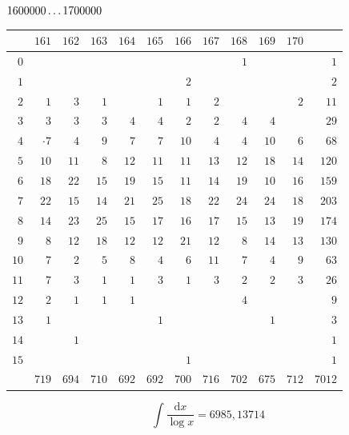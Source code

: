 \clearpage
\noindent\begin{minipage}{\linewidth}\centering
{}
\(1600000\mathinner{.\,.\,.}1700000\)\par\smallskip
\begingroup\fontsize{10.5}{11.5}\selectfont\setlength{\tabcolsep}{3.5pt}\renewcommand{\arraystretch}{1}
\begin{tabular}{r|rrrrrrrrrr|r}\hline
 & $161$ & $162$ & $163$ & $164$ & $165$ & $166$ & $167$ & $168$ & $169$ & $170$ &  \\ \hline
$0$ &  &  &  &  &  &  &  & $1$ &  &  & $1$ \\
$1$ &  &  &  &  &  & $2$ &  &  &  &  & $2$ \\
$2$ & $1$ & $3$ & $1$ &  & $1$ & $1$ & $2$ &  &  & $2$ & $11$ \\
$3$ & $3$ & $3$ & $3$ & $4$ & $4$ & $2$ & $2$ & $4$ & $4$ &  & $29$ \\
$4$ & $\mathord{\cdot}\!7$ & $4$ & $9$ & $7$ & $7$ & $10$ & $4$ & $4$ & $10$ & $6$ & $68$ \\
$5$ & $10$ & $11$ & $8$ & $12$ & $11$ & $11$ & $13$ & $12$ & $18$ & $14$ & $120$ \\
$6$ & $18$ & $22$ & $15$ & $19$ & $15$ & $11$ & $14$ & $19$ & $10$ & $16$ & $159$ \\
$7$ & $22$ & $15$ & $14$ & $21$ & $25$ & $18$ & $22$ & $24$ & $24$ & $18$ & $203$ \\
$8$ & $14$ & $23$ & $25$ & $15$ & $17$ & $16$ & $17$ & $15$ & $13$ & $19$ & $174$ \\
$9$ & $8$ & $12$ & $18$ & $12$ & $12$ & $21$ & $12$ & $8$ & $14$ & $13$ & $130$ \\
$10$ & $7$ & $2$ & $5$ & $8$ & $4$ & $6$ & $11$ & $7$ & $4$ & $9$ & $63$ \\
$11$ & $7$ & $3$ & $1$ & $1$ & $3$ & $1$ & $3$ & $2$ & $2$ & $3$ & $26$ \\
$12$ & $2$ & $1$ & $1$ & $1$ &  &  &  & $4$ &  &  & $9$ \\
$13$ & $1$ &  &  &  & $1$ &  &  &  & $1$ &  & $3$ \\
$14$ &  & $1$ &  &  &  &  &  &  &  &  & $1$ \\
$15$ &  &  &  &  &  & $1$ &  &  &  &  & $1$ \\
\hline
 & $719$ & $694$ & $710$ & $692$ & $692$ & $700$ & $716$ & $702$ & $675$ & $712$ & $7012$ \\ \hline
\end{tabular}\par\endgroup
\setlength{\abovedisplayskip}{6pt}\setlength{\belowdisplayskip}{4pt}
\[\int\frac{\mathrm{d}x}{\log x}=6985{,}13714\]
\end{minipage}\par

